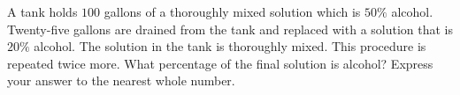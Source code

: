 A tank holds $100$ gallons of a thoroughly mixed solution which is $50\%$ alcohol. Twenty-five gallons are drained from the tank and replaced with a solution that is $20\%$ alcohol. The solution in the tank is thoroughly mixed. This procedure is repeated twice more. What percentage of the final solution is alcohol? Express your answer to the nearest whole number.

